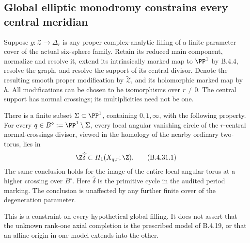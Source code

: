 \subsection{Global elliptic monodromy constrains every central meridian}

\begin{proposition}
Suppose $g:\mathcal Z\to\Delta_r$ is any proper complex-analytic
filling of a finite parameter cover of the actual six-sphere
family. Retain its reduced main component, normalize and resolve
it, extend its intrinsically marked map to $\PP^1$ by B.4.4,
resolve the graph, and resolve the support of its central divisor. Denote
the resulting smooth proper modification by $\widetilde{\mathcal Z}$,
and its holomorphic marked map by $h$. All modifications can be
chosen to be isomorphisms over $r\ne0$. The central support has
normal crossings; its multiplicities need not be one.

There is a finite subset $\Sigma\subset\PP^1$, containing
$0,1,\infty$, with the following property. For every
$q\in B^\circ:=\PP^1\setminus\Sigma$, every local angular
vanishing circle of the $r$-central normal-crossings divisor,
viewed in the homology of the nearby ordinary two-torus, lies in
\[
             \Z\widehat\delta\subset H_1(X_{q,r};\Z).
 \tag{B.4.31.1}
\]
The same conclusion holds for the image of the entire local
angular torus at a higher crossing over $B^\circ$.
Here $\widehat\delta$ is the primitive cycle in the audited
period marking. The conclusion is unaffected by any further
finite cover of the degeneration parameter.

This is a constraint on every hypothetical global filling. It
does not assert that the unknown rank-one axial completion is
the prescribed model of B.4.19, or that an affine origin in one
model extends into the other.
\end{proposition}
